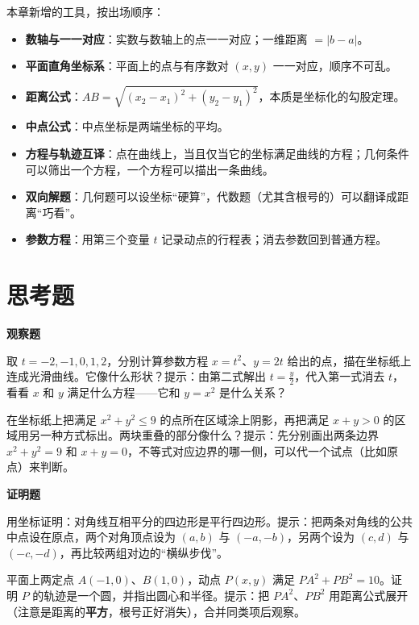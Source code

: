 \begin{toolbox}
本章新增的工具，按出场顺序：

\begin{itemize}
\item \textbf{数轴与一一对应}：实数与数轴上的点一一对应；一维距离 $=\lvert b-a\rvert$。
\item \textbf{平面直角坐标系}：平面上的点与有序数对 $(x,y)$ 一一对应，顺序不可乱。
\item \textbf{距离公式}：$AB=\sqrt{(x_{2}-x_{1})^{2}+(y_{2}-y_{1})^{2}}$，本质是坐标化的勾股定理。
\item \textbf{中点公式}：中点坐标是两端坐标的平均。
\item \textbf{方程与轨迹互译}：点在曲线上，当且仅当它的坐标满足曲线的方程；几何条件可以筛出一个方程，一个方程可以描出一条曲线。
\item \textbf{双向解题}：几何题可以设坐标“硬算”，代数题（尤其含根号的）可以翻译成距离“巧看”。
\item \textbf{参数方程}：用第三个变量 $t$ 记录动点的行程表；消去参数回到普通方程。
\end{itemize}
\end{toolbox}

\section*{思考题}

\textbf{观察题}

\begin{sikao}
\item 取 $t=-2,-1,0,1,2$，分别计算参数方程 $x=t^{2}$、$y=2t$ 给出的点，描在坐标纸上连成光滑曲线。它像什么形状？提示：由第二式解出 $t=\frac{y}{2}$，代入第一式消去 $t$，看看 $x$ 和 $y$ 满足什么方程——它和 $y=x^{2}$ 是什么关系？
\item 在坐标纸上把满足 $x^{2}+y^{2}\le 9$ 的点所在区域涂上阴影，再把满足 $x+y>0$ 的区域用另一种方式标出。两块重叠的部分像什么？提示：先分别画出两条边界 $x^{2}+y^{2}=9$ 和 $x+y=0$，不等式对应边界的哪一侧，可以代一个试点（比如原点）来判断。
\end{sikao}

\textbf{证明题}

\begin{sikao}
\item 用坐标证明：对角线互相平分的四边形是平行四边形。提示：把两条对角线的公共中点设在原点，两个对角顶点设为 $(a,b)$ 与 $(-a,-b)$，另两个设为 $(c,d)$ 与 $(-c,-d)$，再比较两组对边的“横纵步伐”。
\item 平面上两定点 $A(-1,0)$、$B(1,0)$，动点 $P(x,y)$ 满足 $PA^{2}+PB^{2}=10$。证明 $P$ 的轨迹是一个圆，并指出圆心和半径。提示：把 $PA^{2}$、$PB^{2}$ 用距离公式展开（注意是距离的\textbf{平方}，根号正好消失），合并同类项后观察。
\end{sikao}


